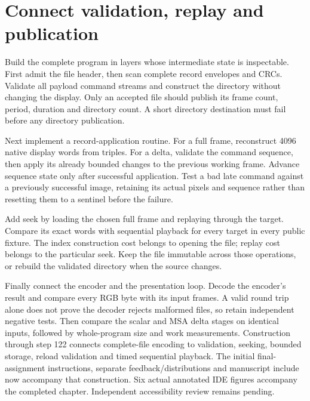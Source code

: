 \section{Connect validation, replay and publication}
Build the complete program in layers whose intermediate state is inspectable.
First admit the file header, then scan complete record envelopes and CRCs. Validate
all payload command streams and construct the directory without changing the display.
Only an accepted file should publish its frame count, period, duration and directory
count. A short directory destination must fail before any directory publication.

Next implement a record-application routine. For a full frame, reconstruct 4096
native display words from triples. For a delta, validate the command sequence, then
apply its already bounded changes to the previous working frame. Advance sequence
state only after successful application. Test a bad late command against a previously
successful image, retaining its actual pixels and sequence rather than resetting them
to a sentinel before the failure.

Add seek by loading the chosen full frame and replaying through the target. Compare
its exact words with sequential playback for every target in every public fixture.
The index construction cost belongs to opening the file; replay cost belongs to the
particular seek. Keep the file immutable across those operations, or rebuild the
validated directory when the source changes.

Finally connect the encoder and the presentation loop. Decode the encoder's result
and compare every RGB byte with its input frames. A valid round trip alone does not
prove the decoder rejects malformed files, so retain independent negative tests.
Then compare the scalar and MSA delta stages on identical inputs, followed by
whole-program size and work measurements. Construction through step 122 connects complete-file encoding to validation,
seeking, bounded storage, reload validation and timed sequential playback. The
initial final-assignment instructions, separate feedback/distributions and manuscript
include now accompany that construction. Six actual annotated IDE figures accompany
the completed chapter. Independent accessibility review remains pending.
